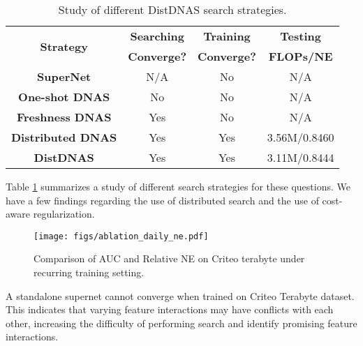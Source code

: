 \begin{table}[t]
\begin{center}
    \caption{Study of different DistDNAS search strategies.}
    \vspace{-1em}
    \begin{scalebox}{0.96}{
        \begin{tabular}{|c|c|c|c|}
        \hline
        \multirow{2}{*}{\textbf{Strategy}} & \textbf{Searching} & \textbf{Training} & \textbf{Testing}  \\
        & \textbf{Converge?} & \textbf{Converge?} & \textbf{FLOPs/NE} \\
        \hline
        \textbf{SuperNet} & N/A & No & N/A \\
        \textbf{One-shot DNAS} & No & No & N/A \\
        \textbf{Freshness DNAS} & Yes & No & N/A \\
        \textbf{Distributed DNAS} & Yes & Yes & 3.56M/0.8460 \\
        \textbf{DistDNAS} & Yes & Yes & 3.11M/0.8444 \\
        \hline
    \end{tabular}
    }    
    \end{scalebox}
    \label{tab:distdnas_strategy}    
\end{center}
\vspace{-1em}
\end{table}


Table \ref{tab:distdnas_strategy} summarizes a study of different search strategies for these questions. We have a few findings regarding the use of distributed search and the use of cost-aware regularization.

\begin{figure}[b]
    \vspace{-1em}
    \begin{center}
    \texttt{[image: figs/ablation\_daily\_ne.pdf]}
    \vspace{-1em}
    \caption{Comparison of AUC and Relative NE on Criteo terabyte under recurring training setting.}
    \label{fig:ablation_ne_recurring}    
    \end{center}
\end{figure}

A standalone supernet cannot converge when trained on Criteo Terabyte dataset. This indicates that varying feature interactions may have conflicts with each other, increasing the difficulty of performing search and identify promising feature interactions.

